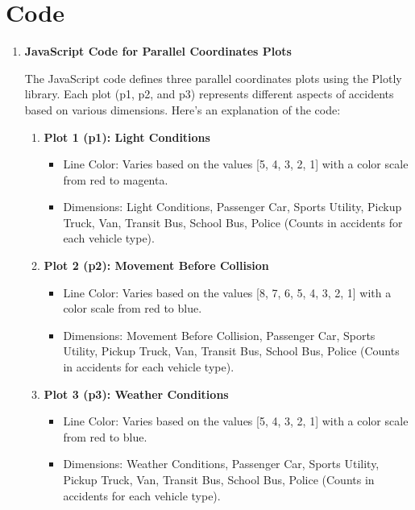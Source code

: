 \documentclass[conference]{IEEEtran}
\begin{document}
\section{Code}

\begin{enumerate}
\item 
\textbf{JavaScript Code for Parallel Coordinates Plots}

The JavaScript code defines three parallel coordinates plots using the Plotly library. Each plot (p1, p2, and p3) represents different aspects of accidents based on various dimensions. Here's an explanation of the code:

\begin{enumerate}
    \item \textbf{Plot 1 (p1): Light Conditions}
        \begin{itemize}
            \item Line Color: Varies based on the values [5, 4, 3, 2, 1] with a color scale from red to magenta.
            \item Dimensions: Light Conditions, Passenger Car, Sports Utility, Pickup Truck, Van, Transit Bus, School Bus, Police (Counts in accidents for each vehicle type).
        \end{itemize}
    \item \textbf{Plot 2 (p2): Movement Before Collision}
        \begin{itemize}
            \item Line Color: Varies based on the values [8, 7, 6, 5, 4, 3, 2, 1] with a color scale from red to blue.
            \item Dimensions: Movement Before Collision, Passenger Car, Sports Utility, Pickup Truck, Van, Transit Bus, School Bus, Police (Counts in accidents for each vehicle type).
        \end{itemize}
    \item \textbf{Plot 3 (p3): Weather Conditions}
        \begin{itemize}
            \item Line Color: Varies based on the values [5, 4, 3, 2, 1] with a color scale from red to blue.
            \item Dimensions: Weather Conditions, Passenger Car, Sports Utility, Pickup Truck, Van, Transit Bus, School Bus, Police (Counts in accidents for each vehicle type).
        \end{itemize}
\end{enumerate}



\end{enumerate}
\end{document}
